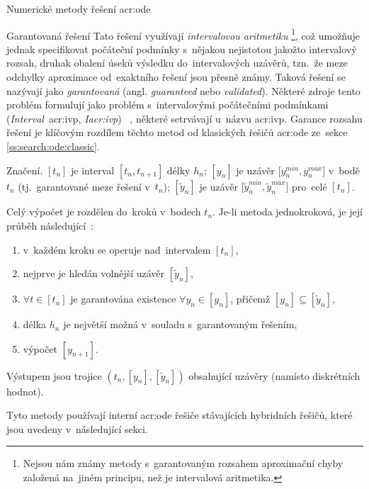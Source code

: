 \documentclass[thesis=M,czech]{FITthesis}[2012/06/26]
\newcommand{\acrlabel}[1]{acr:#1}
\newcommand{\acr}[1]{\acrshort{\acrlabel{#1}}}
\newcommand{\hl}[1]{\textit{#1}}
\newcommand{\name}[1]{\hl{#1}}
\newcommand{\cit}[1]{\cite{#1}}
\newcommand{\rf}[1]{\ref{#1}}
\newcommand{\pred}[1]{\ensuremath{\tilde{#1}}}
\begin{document}
\begin{section}{Numerické metody řešení \acr{ode}}

\begin{subsection}{Garantovaná řešení}\label{ss:search:ode:valid}
Tato řešení využívají \name{intervalovou aritmetiku}%
\footnote{Nejsou nám známy metody s~garantovaným rozsahem aproximační chyby
založená na~jiném principu, než je intervalová aritmetika.},
což umožňuje jednak specifikovat počáteční podmínky
s~nějakou nejistotou jakožto intervalový rozsah,
druhak obalení úseků výsledku do~intervalových uzávěrů,
tzn.~že meze odchylky aproximace od~exaktního řešení
jsou přesně známy.
Taková řešení se nazývají jako \name{garantovaná}
(angl. \name{guaranteed} nebo \name{validated}).
Některé zdroje tento problém formulují
jako problém s~intervalovými počátečními podmínkami
(\name{Interval}~\acr{ivp}, \name{I\acr{ivp}})%
~\cit{ode-valid-runge_kutta-art},
některé setrvávají u~názvu \acr{ivp}.
Garance rozsahu řešení je klíčovým rozdílem
těchto metod
od klasických řešičů \acr{ode}
ze~sekce \rf{ss:search:ode:classic}.


\begin{paragraph}{Značení.}\label{p:search:ode:sign}
${[t_n]}$ je interval ${[t_{n}, t_{n+1}]}$ délky $h_n$;
${[y_n]}$ je uzávěr ${[y^{min}_{n}, y^{max}_{n}}]$ v~bodě $t_n$
(tj.~garantované meze řešení v~$t_n$);
${[\pred{y}_n]}$ je uzávěr ${[\pred{y}^{min}_{n}, \pred{y}^{max}_{n}}]$
pro~celé ${[t_n]}$.
\end{paragraph} %


\bigskip

Celý výpočet je rozdělen do~kroků v~bodech $t_n$.
Je-li metoda jednokroková,
je její průběh následující~\cit{ode-valid-runge_kutta-art}:
\begin{enumerate}
\item v~každém kroku se operuje nad~intervalem ${[t_{n}]}$,
\item nejprve je hledán volnější uzávěr ${[\pred{y}_n]}$,
\item ${\forall t \in [t_n]}$ je garantována existence
   ${\forall y_n \in [y_n]}$, přičemž
   ${[y_n] \subseteq [\pred{y}_n]}$,
\item délka $h_n$ je největší možná v~souladu s~garantovaným řešením,
\item výpočet ${[y_{n+1}]}$.
\end{enumerate}
Výstupem jsou trojice ${(t_n, [y_n], [\pred{y}_n])}$
obsahující uzávěry (namísto diskrétních hodnot).

Tyto metody používají interní \acr{ode} řešiče
stávajících hybridních řešičů,
které jsou uvedeny v~následující sekci.
\end{subsection} %


\end{section} %
\end{document}
